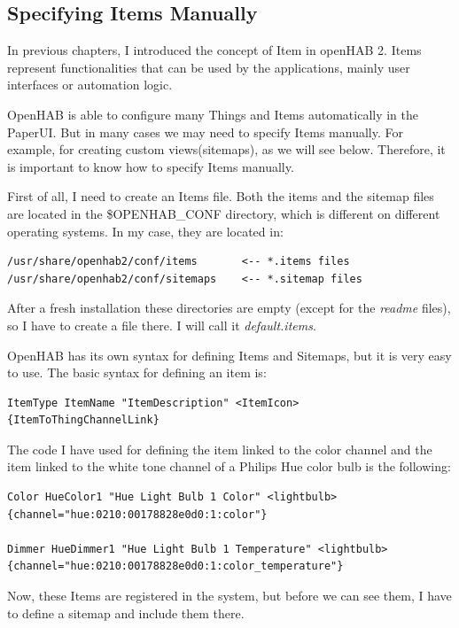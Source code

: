 \subsection{Specifying Items Manually}
In previous chapters, I introduced the concept of Item in openHAB 2. Items represent functionalities that can be used by the
applications, mainly user interfaces or automation logic.

OpenHAB is able to configure many Things and Items automatically in the PaperUI. But in many cases we may need to specify Items
manually. For example, for creating custom views(sitemaps), as we will see below. Therefore, it is important to know how to specify
Items manually.

First of all, I need to create an Items file. Both the items and the sitemap files are located in the \$OPENHAB\_CONF directory,
which is different on different operating systems. In my case, they are located in:

\begin{lstlisting}[style=Consola]
/usr/share/openhab2/conf/items       <-- *.items files
/usr/share/openhab2/conf/sitemaps    <-- *.sitemap files
\end{lstlisting}

After a fresh installation these directories are empty (except for the \textit{readme} files), so I have to create a file there.
I will call it \textit{default.items}.

OpenHAB has its own syntax for defining Items and Sitemaps, but it is very easy to use. The basic syntax for defining an item is:

\begin{lstlisting}[style=Consola]
ItemType ItemName "ItemDescription" <ItemIcon> {ItemToThingChannelLink}
\end{lstlisting}

The code I have used for defining the item linked to the color channel and the item linked to the white tone channel of a Philips
Hue color bulb is the following:

\begin{lstlisting}[style=Consola]
Color HueColor1 "Hue Light Bulb 1 Color" <lightbulb> {channel="hue:0210:00178828e0d0:1:color"}

Dimmer HueDimmer1 "Hue Light Bulb 1 Temperature" <lightbulb> {channel="hue:0210:00178828e0d0:1:color_temperature"}
\end{lstlisting}

Now, these Items are registered in the system, but before we can see them, I have to define a sitemap and include them there.

